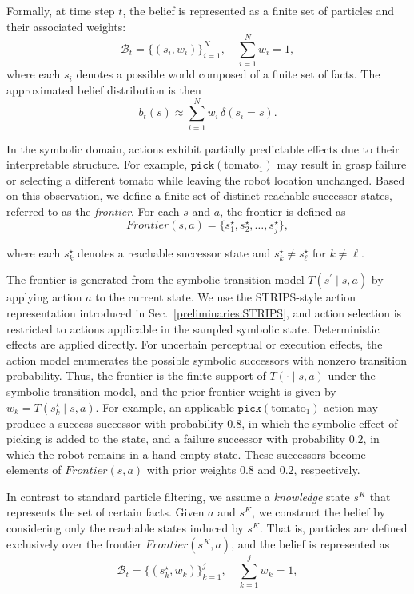 Formally, at time step $t$, the belief is represented as a finite set of particles and their associated weights:
\[
\mathcal{B}_t = \{ (s_i, w_i) \}_{i=1}^{N}, \quad \sum_{i=1}^{N} w_i = 1,
\]
where each $s_i$ denotes a possible world composed of a finite set of facts. The approximated belief distribution is then
\[
b_t(s) \approx \sum_{i=1}^{N} w_i \, \delta(s_i = s).
\]


In the symbolic domain, actions exhibit partially predictable effects due to their interpretable structure. For example, $\texttt{pick}(\text{tomato}_1)$ may result in grasp failure or selecting a different tomato while leaving the robot location unchanged. Based on this observation, we define a finite set of distinct reachable successor states, referred to as the \textit{frontier}. For each $s$ and $a$, the frontier is defined as
\[
Frontier(s,a) = \{ s_1^{\star}, s_2^{\star}, \dots, s_j^{\star} \},
\]

where each $s_k^{\star}$ denotes a reachable successor state and $s_k^\star \neq s_\ell^\star$ for $k \neq \ell$.


The frontier is generated from the symbolic transition model $T(s^\prime \mid s,a)$ by applying action $a$ to the current state. We use the STRIPS-style action representation introduced in Sec.~\ref{preliminaries:STRIPS}, and action selection is restricted to actions applicable in the sampled symbolic state. Deterministic effects are applied directly. For uncertain perceptual or execution effects, the action model enumerates the possible symbolic successors with nonzero transition probability. Thus, the frontier is the finite support of $T(\cdot \mid s,a)$ under the symbolic transition model, and the prior frontier weight is given by $w_k = T(s_k^\star \mid s,a)$. For example, an applicable $\texttt{pick}(\text{tomato}_1)$ action may produce a success successor with probability $0.8$, in which the symbolic effect of picking is added to the state, and a failure successor with probability $0.2$, in which the robot remains in a hand-empty state. These successors become elements of $Frontier(s,a)$ with prior weights $0.8$ and $0.2$, respectively. 

In contrast to standard particle filtering, we assume a \textit{knowledge} state $s^{K}$ that represents the set of certain facts. Given $a$ and $s^{K}$, we construct the belief by considering only the reachable states induced by $s^{K}$. That is, particles are defined exclusively over the frontier $Frontier(s^{K}, a)$, and the belief is represented as
\[
\mathcal{B}_t = \{ (s_k^{\star}, w_k) \}_{k=1}^{j}, \quad \sum_{k=1}^{j} w_k = 1,
\]


